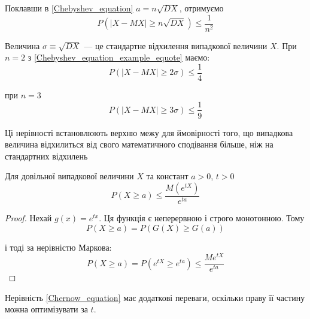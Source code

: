 \begin{example}    
    Поклавши в \ref{Chebyshev_equation} $a = n \sqrt{DX}$, отримуємо 
    \begin{equation}
        \label{Chebyshev_equation_example_equote}
        P(|X - MX| \geqslant n \sqrt{DX}) \leqslant \dfrac{1}{n^2}
    \end{equation}

    Величина $\sigma \equiv \sqrt{DX}$ --- це стандартне відхилення
    випадкової величини $X$.
    При $n = 2$ з \ref{Chebyshev_equation_example_equote} маємо:
    $$P(|X - MX| \geqslant 2 \sigma) \leqslant \dfrac{1}{4}$$

    при $n = 3$ 
    $$P(|X - MX| \geqslant 3 \sigma) \leqslant \dfrac{1}{9}$$

    Ці нерівності встановлюють верхню межу для ймовірності того, що
    випадкова величина відхилиться від свого математичного
    сподівання більше, ніж на  стандартних відхилень
\end{example}

\begin{theorem}
    Для довільної випадкової величини $X$ та констант
    $a > 0$, $t > 0$
    \begin{equation}
        \label{Chernow_equation}
        P(X \geqslant a) \leqslant \dfrac{M(e^{tX})}{e^{ta}}
    \end{equation}
\end{theorem}
\begin{proof}
    Нехай $g(x) = e^{tx}$.
    Ця функція є неперервною і строго монотонною.
    Тому
    $$P(X \geqslant a) = P(G(X) \geqslant G(a))$$

    і тоді за нерівністю Маркова:
    $$P(X \geqslant a) = P(e^{tX} \geqslant e^{ta}) \leqslant \dfrac{Me^{tX}}{e^{ta}}$$
\end{proof}

Нерівність \ref{Chernow_equation} має додаткові переваги, оскільки
праву її частину можна оптимізувати за $t$.

